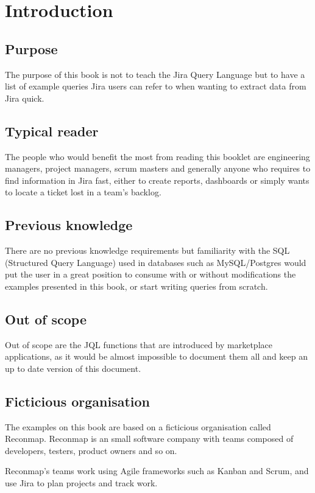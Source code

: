 \newpage
\chapter{Introduction}

\section{Purpose}

The purpose of this book is not to teach the Jira Query Language but to have a list of example queries Jira users can refer to when wanting to extract data from Jira quick.

\section{Typical reader}

The people who would benefit the most from reading this booklet are engineering managers, project managers, scrum masters and generally anyone who requires to find information in Jira fast, either to create reports, dashboards or simply wants to locate a ticket lost in a team's backlog.

\section{Previous knowledge}

There are no previous knowledge requirements but familiarity with the SQL (Structured Query Language) used in databases such as MySQL/Postgres would put the user in a great position to consume with or without modifications the examples presented in this book, or start writing queries from scratch.

\section{Out of scope}

Out of scope are the JQL functions that are introduced by marketplace applications, as it would be almost impossible to document them all and keep an up to date version of this document.

\section{Ficticious organisation}

The examples on this book are based on a ficticious organisation called Reconmap. Reconmap is an small software company with teams composed of developers, testers, product owners and so on.

Reconmap's teams work using Agile frameworks such as Kanban and Scrum, and use Jira to plan projects and track work.